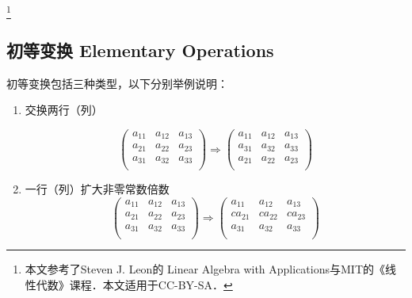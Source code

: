 
\begin{issues}
\issueMissDepend
\end{issues}

\footnote{本文参考了Steven J. Leon的 Linear Algebra with Applications与MIT的《线性代数》课程．本文适用于CC-BY-SA．}

\subsection{初等变换 Elementary Operations}
初等变换包括三种类型，以下分别举例说明：

\begin{enumerate}
\item 交换两行（列）

\begin{equation}
\begin{pmatrix}
        a_{11} & a_{12} & a_{13}\\
        a_{21} & a_{22} & a_{23}\\
        a_{31} & a_{32} & a_{33}\\
\end{pmatrix}
\Rightarrow
\begin{pmatrix}
        a_{11} & a_{12} & a_{13}\\
        a_{31} & a_{32} & a_{33}\\
        a_{21} & a_{22} & a_{23}\\
\end{pmatrix}
\end{equation}

\item 一行（列）扩大非零常数倍数
\begin{equation}
\begin{pmatrix}
        a_{11} & a_{12} & a_{13}\\
        a_{21} & a_{22} & a_{23}\\
        a_{31} & a_{32} & a_{33}\\
\end{pmatrix}
\Rightarrow
\begin{pmatrix}
        a_{11} & a_{12} & a_{13}\\
        ca_{21} & ca_{22} & ca_{23}\\
        a_{31} & a_{32} & a_{33}\\
\end{pmatrix}
\end{equation}


\end{enumerate}
